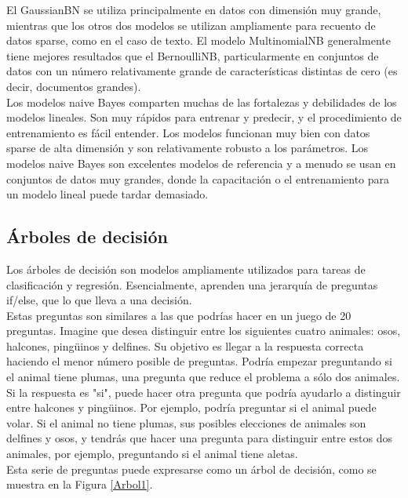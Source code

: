 {El GaussianBN se utiliza principalmente en datos con dimensión muy grande, mientras que los otros dos  modelos se utilizan ampliamente para  recuento de datos sparse, como en el caso de  texto. El modelo MultinomialNB generalmente tiene mejores resultados que el  BernoulliNB, particularmente en conjuntos de datos con un número relativamente grande de características distintas de cero (es decir, documentos grandes).\\

Los  modelos naive Bayes   comparten muchas de las fortalezas y debilidades de los modelos lineales. Son muy rápidos para entrenar y predecir, y el procedimiento de entrenamiento es fácil entender. Los modelos funcionan muy bien con datos sparse de alta dimensión y son relativamente robusto a los parámetros. Los modelos naive Bayes  son excelentes modelos de referencia y   a menudo se usan en conjuntos de datos muy grandes, donde la capacitación o el entrenamiento para un modelo lineal puede tardar demasiado.

\subsection{Árboles de decisión}

Los árboles de decisión son modelos ampliamente utilizados para tareas de clasificación y regresión. Esencialmente,  aprenden una jerarquía de preguntas if{\scriptsize{/}}else, que lo que lleva a una decisión. \\

Estas preguntas son similares a las que podrías hacer en un juego de 20 preguntas. Imagine que desea distinguir entre los siguientes cuatro animales: osos, halcones, pingüinos y delfines. Su objetivo es llegar a la respuesta correcta haciendo el menor número posible de preguntas. Podría empezar preguntando
 si el animal tiene plumas, una pregunta que reduce el problema a sólo dos  animales.
Si la respuesta es  "{}si"{}, puede hacer otra pregunta que podría ayudarlo a distinguir entre halcones y
pingüinos. Por ejemplo, podría preguntar si el animal puede volar. Si el animal no tiene plumas, sus posibles elecciones de animales son delfines y osos, y  tendrás que hacer una pregunta para distinguir entre estos dos animales, por ejemplo, preguntando si el animal tiene aletas. \\

Esta serie de preguntas puede expresarse como un árbol de decisión, como se muestra en la Figura \ref{Arbol1}.\\

}

